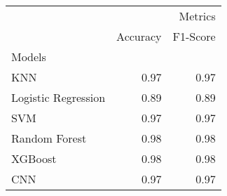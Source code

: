 \begin{tabular}{lrr}
\toprule
 & \multicolumn{2}{r}{Metrics} \\
 & Accuracy & F1-Score \\
Models &  &  \\
\midrule
KNN & 0.97 & 0.97 \\
Logistic Regression & 0.89 & 0.89 \\
SVM & 0.97 & 0.97 \\
Random Forest & 0.98 & 0.98 \\
XGBoost & 0.98 & 0.98 \\
CNN & 0.97 & 0.97 \\
\bottomrule
\end{tabular}
